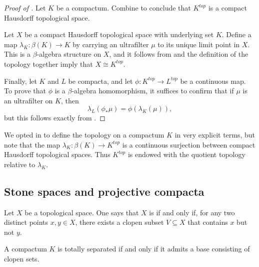 \begin{proof}[Proof of ]
	Let $ K $ be a compactum.
	Combine  to conclude that $ K^{\textit{top}} $ is a compact Hausdorff topological space.

	Let $ X $ be a compact Hausdorff topological space with underlying set $ K $.
	Define a map $ \lambda_K \colon \beta(K) \to K $ by carrying an ultrafilter $ \mu $ to its unique limit point in $ X $.
	This is a $ \beta $-algebra structure on $ X $, and it follows from  and the definition of the topology together imply that $ X \cong K^{\textit{top}}$.

	Finally, let $ K $ and $ L $ be compacta, and let $ \phi \colon K^{\textit{top}} \to L^{\textit{top}} $ be a continuous map.
	To prove that $ \phi $ is a $ \beta $-algebra homomorphism, it suffices to confirm that if $ \mu $ is an ultrafilter on $ K $, then
	\[
		\lambda_L (\phi_{\ast} \mu) = \phi (\lambda_K(\mu)) \comma
	\]
	but this follows exactly from .
\end{proof}

\begin{nul}
	We opted in  to define the topology on a compactum $ K $ in very explicit terms, but note that the map $ \lambda_K \colon \beta(K) \to K^{\textit{top}} $ is a continuous surjection between compact Hausdorff topological spaces.
	Thus $ K^{\textit{top}} $ is endowed with the quotient topology relative to $ \lambda_K $.
\end{nul}

\subsection{Stone spaces and projective compacta}

\begin{dfn}
	Let $ X $ be a topological space.
	One says that $ X $ is  if and only if, for any two distinct points $ x, y \in X $, there exists a clopen subset $ V \subseteq X $ that contains $ x $ but not $ y $.
\end{dfn}

\begin{lem}
	A compactum $ K $ is totally separated if and only if it admits a base consisting of clopen sets.
\end{lem}

